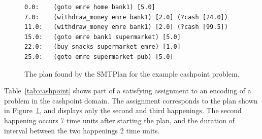 \begin{figure}[thb]
\small
\begin{verbatim}
0.0:	(goto emre home bank1) [5.0]
7.0:	(withdraw_money emre bank1) [2.0] (?cash [24.0])
11.0:	(withdraw_money emre bank1) [2.0] (?cash [99.5])
15.0:	(goto emre bank1 supermarket) [5.0]
22.0:	(buy_snacks supermarket emre) [1.0]
25.0:	(goto emre supermarket pub) [5.0]
\end{verbatim}
\caption{The plan found by the SMTPlan for the example cashpoint problem.}
\label{fig:cashpoint plan}
\end{figure}

Table~\ref{tab:cashpoint} shows part of a satisfying assignment to an encoding of a problem in the cashpoint domain. The assignment corresponds to the plan shown in Figure~\ref{fig:cashpoint plan}, and displays only the second and third happenings. The second happening occurs 7 time units after starting the plan, and the duration of interval between the two happenings 2 time units.

